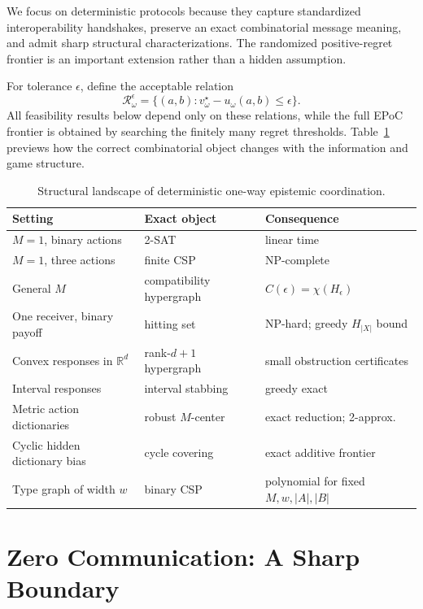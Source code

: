 \documentclass[letterpaper]{article} %
\newcommand{\Rset}{\mathcal{R}}
\begin{document}
We focus on deterministic protocols because they capture standardized
interoperability handshakes, preserve an exact combinatorial message meaning,
and admit sharp structural characterizations. The randomized positive-regret
frontier is an important extension rather than a hidden assumption.

For tolerance $\epsilon$, define the acceptable relation
\[
\Rset_\omega^\epsilon=
\{(a,b):v_\omega^\star-u_\omega(a,b)\le\epsilon\}.
\]
All feasibility results below depend only on these relations, while the full
EPoC frontier is obtained by searching the finitely many regret thresholds.
Table~\ref{tab:landscape} previews how the correct combinatorial object changes
with the information and game structure.

\begin{table}[t]
\centering
\small
\setlength{\tabcolsep}{3.2pt}
\begin{tabular}{p{}p{}p{}}
\toprule
Setting & Exact object & Consequence \\
\midrule
$M=1$, binary actions & 2-SAT & linear time \\
$M=1$, three actions & finite CSP & NP-complete \\
General $M$ & compatibility hypergraph & $C(\epsilon)=\chi(H_\epsilon)$ \\
One receiver, binary payoff & hitting set & NP-hard; greedy $H_{|X|}$ bound \\
Convex responses in $\mathbb R^d$ & rank-$d{+}1$ hypergraph & small obstruction certificates \\
Interval responses & interval stabbing & greedy exact \\
Metric action dictionaries & robust $M$-center & exact reduction; 2-approx. \\
Cyclic hidden dictionary bias & cycle covering & exact additive frontier \\
Type graph of width $w$ & binary CSP & polynomial for fixed $M,w,|A|,|B|$ \\
\bottomrule
\end{tabular}
\caption{Structural landscape of deterministic one-way epistemic coordination.}
\label{tab:landscape}
\end{table}

\section{Zero Communication: A Sharp Boundary}
\end{document}
